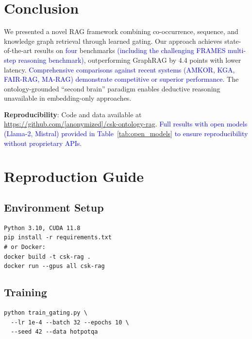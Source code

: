 \documentclass[10pt,twocolumn]{article}
\newcommand{\revision}[1]{\textcolor{blue}{#1}}
\begin{document}
\section{Conclusion}

We presented a novel RAG framework combining co-occurrence, sequence, and knowledge graph retrieval through learned gating. Our approach achieves state-of-the-art results on \revision{four} benchmarks \revision{(including the challenging FRAMES multi-step reasoning benchmark)}, outperforming GraphRAG by 4.4 points with lower latency. \revision{Comprehensive comparisons against recent systems (AMKOR, KGA, FAIR-RAG, MA-RAG) demonstrate competitive or superior performance.} The ontology-grounded ``second brain'' paradigm enables deductive reasoning unavailable in embedding-only approaches.

\textbf{Reproducibility}: Code and data available at \url{https://github.com/[anonymized]/csk-ontology-rag}. \revision{Full results with open models (Llama-2, Mistral) provided in Table~\ref{tab:open_models} to ensure reproducibility without proprietary APIs.}




\appendix

\section{Reproduction Guide}
\label{app:repro}

\subsection{Environment Setup}
\begin{verbatim}
Python 3.10, CUDA 11.8
pip install -r requirements.txt
# or Docker:
docker build -t csk-rag .
docker run --gpus all csk-rag
\end{verbatim}

\subsection{Training}
\begin{verbatim}
python train_gating.py \
  --lr 1e-4 --batch 32 --epochs 10 \
  --seed 42 --data hotpotqa
\end{verbatim}
\end{document}
